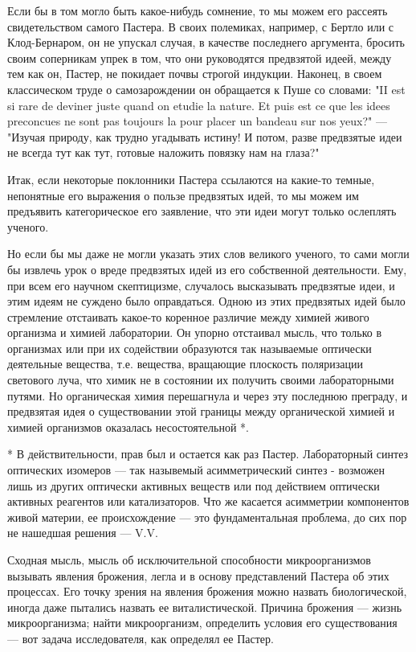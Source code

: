 Если  бы в  том  могло быть  какое-нибудь сомнение,  то  мы можем  его
рассеять свидетельством  самого Пастера. В своих  полемиках, например,
с  Бертло  или с  Клод-Бернаром,  он  не  упускал случая,  в  качестве
последнего  аргумента,  бросить  своим  соперникам упрек  в  том,  что
они  руководятся  предвзятой  идеей,  между тем  как  он,  Пастер,  не
покидает почвы строгой индукции. Наконец, в своем классическом труде о
самозарождении он  обращается к Пуше  со словами:  "II est si  rare de
deviner juste quand on etudie la nature.  Et puis est ce que les idees
preconcues ne  sont pas  toujours la  pour placer  un bandeau  sur nos
yeux?"  --- "Изучая  природу, как  трудно угадывать  истину! И  потом,
разве предвзятые идеи не всегда  тут как тут, готовые наложить повязку
нам на глаза?"

Итак, если некоторые поклонники  Пастера ссылаются на какие-то темные,
непонятные  его выражения  о пользе  предвзятых идей,  то мы  можем им
предъявить  категорическое его  заявление, что  эти идеи  могут только
ослеплять ученого.

Но  если бы  мы  даже не  могли указать  этих  слов великого  ученого,
то  сами  могли  бы  извлечь  урок о  вреде  предвзятых  идей  из  его
собственной  деятельности.  Ему,  при всем  его  научном  скептицизме,
случалось высказывать  предвзятые идеи, и  этим идеям не  суждено было
оправдаться. Одною из этих  предвзятых идей было стремление отстаивать
какое-то  коренное различие  между  химией живого  организма и  химией
лаборатории. Он  упорно отстаивал мысль,  что только в  организмах или
при  их  содействии  образуются так  называемые  оптически  деятельные
вещества,  т.е. вещества,  вращающие  плоскость поляризации  светового
луча,  что  химик не  в  состоянии  их получить  своими  лабораторными
путями.  Но  органическая  химия  перешагнула и  через  эту  последнюю
преграду,  и  предвзятая  идея  о  существовании  этой  границы  между
органической химией и химией организмов оказалась несостоятельной *.

* В действительности, прав был и остается как раз Пастер. Лабораторный
синтез оптических изомеров ---  так назывемый асимметрический синтез -
возможен лишь из  других оптически активных веществ  или под действием
оптически  активных  реагентов  или  катализаторов.  Что  же  касается
асимметрии  компонентов  живой  материи,   ее  происхождение  ---  это
фундаментальная проблема, до сих пор не нашедшая решения --- V.V.

Сходная  мысль, мысль  об  исключительной способности  микроорганизмов
вызывать явления брожения,  легла и в основу  представлений Пастера об
этих процессах.  Его точку  зрения на  явления брожения  можно назвать
биологической,  иногда  даже   пытались  назвать  ее  виталистической.
Причина  брожения  ---   жизнь  микроорганизма;  найти  микроорганизм,
определить условия его существования --- вот задача исследователя, как
определял ее Пастер.

